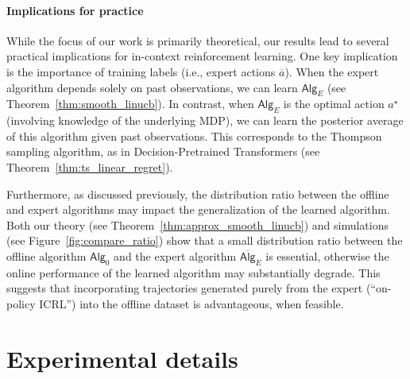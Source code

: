 \documentclass[10pt]{article}
\newcommand{\<}{\left\langle}
\renewcommand{\>}{\right\rangle}
\newcommand{\red}[1]{{\color{red} {#1}}}
\newcommand{\widebar}[1]{\overline{#1}}
\newcommand{\eaction}{{\widebar{a}}}%
\newcommand{\sAlg}{{\mathsf{Alg}}}
\newcommand{\osAlg}{\overline{\mathsf{Alg}}}
\newcommand{\prior}{{\Lambda}}
\newcommand{\shortexp}{{E}}
\begin{document}




\paragraph{Implications for practice} While the focus of our work is primarily theoretical, our results lead to several practical implications for in-context reinforcement learning. One key implication is the importance of training labels (i.e., expert actions $\eaction$). When the expert algorithm depends solely on past observations, we can learn ${\sAlg}_{\shortexp}$ (see Theorem~\ref{thm:smooth_linucb}). In contrast, when ${\sAlg}_{\shortexp}$ is the optimal action $a^\star$ (involving knowledge of the underlying MDP), we can learn the posterior average of this algorithm given past observations. This corresponds to the Thompson sampling algorithm, as in Decision-Pretrained Transformers (see Theorem~\ref{thm:ts_linear_regret}). 

Furthermore, as discussed previously, the distribution ratio between the offline and expert algorithms may impact the generalization of the learned algorithm. Both our theory (see Theorem~\ref{thm:approx_smooth_linucb}) and simulations (see Figure~\ref{fig:compare_ratio}) show that a small distribution ratio between the offline algorithm $\sAlg_0$ and the expert algorithm $\osAlg_{\shortexp}$ is essential, otherwise the online performance of the learned algorithm may substantially degrade. This suggests that incorporating trajectories generated purely from the expert (``on-policy ICRL'') into the offline dataset is advantageous, when feasible. 


\section{Experimental details}\label{sec:exp_details}
\end{document}
